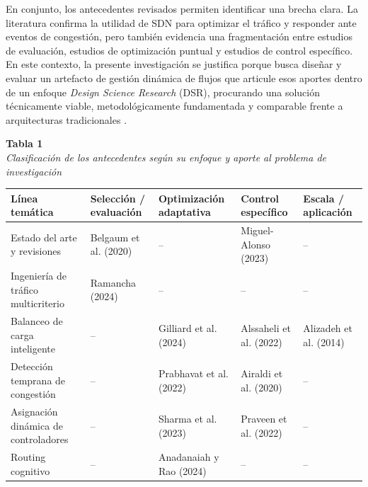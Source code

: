 \documentclass[12pt,a4paper]{article}
\begin{document}
En conjunto, los antecedentes revisados permiten identificar una brecha clara. La literatura confirma la utilidad de SDN para optimizar el tráfico y responder ante eventos de congestión, pero también evidencia una fragmentación entre estudios de evaluación, estudios de optimización puntual y estudios de control específico. En este contexto, la presente investigación se justifica porque busca diseñar y evaluar un artefacto de gestión dinámica de flujos que articule esos aportes dentro de un enfoque \textit{Design Science Research} (DSR), procurando una solución técnicamente viable, metodológicamente fundamentada y comparable frente a arquitecturas tradicionales \parencite{b4_google_sdn, congestion_lb_datacenter}.

\begin{table}[H]
\centering
\renewcommand{\arraystretch}{1.2}
\scriptsize

\textbf{Tabla 1}\\[0.12cm]
\textit{Clasificación de los antecedentes según su enfoque y aporte al problema de investigación}

\vspace{0.2cm}

\begin{tabular}{|p{2.5cm}|p{2.7cm}|p{2.7cm}|p{2.7cm}|p{2.5cm}|}
\hline
\textbf{Línea temática} & \textbf{Selección / evaluación} & \textbf{Optimización adaptativa} & \textbf{Control específico} & \textbf{Escala / aplicación} \\
\hline

Estado del arte y revisiones &
Belgaum et al. (2020) &
-- &
Miguel-Alonso (2023) &
-- \\
\hline

Ingeniería de tráfico multicriterio &
Ramancha (2024) &
-- &
-- &
-- \\
\hline

Balanceo de carga inteligente &
-- &
Gilliard et al. (2024) &
Alssaheli et al. (2022) &
Alizadeh et al. (2014) \\
\hline

Detección temprana de congestión &
-- &
Prabhavat et al. (2022) &
Airaldi et al. (2020) &
-- \\
\hline

Asignación dinámica de controladores &
-- &
Sharma et al. (2023) &
Praveen et al. (2022) &
-- \\
\hline

Routing cognitivo &
-- &
Anadanaiah y Rao (2024) &
-- &
-- \\
\hline


\end{tabular}
\end{table}
\end{document}
